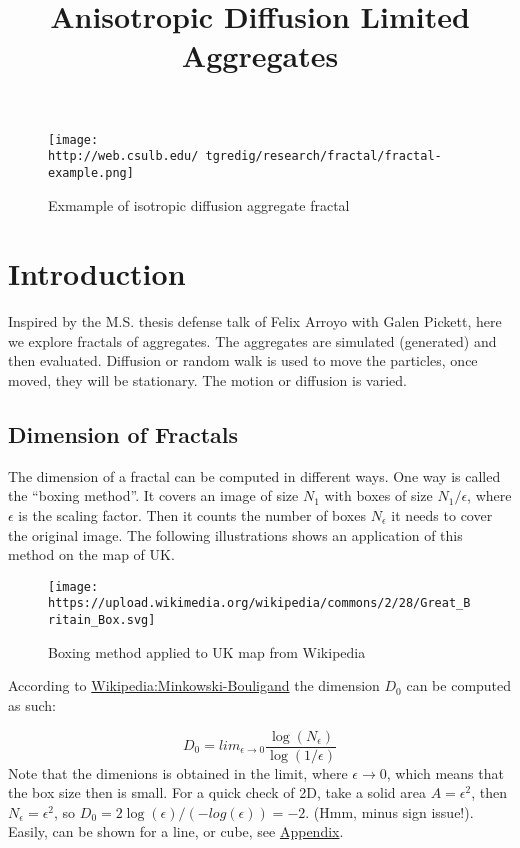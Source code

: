 \documentclass[]{article}
\title{Anisotropic Diffusion Limited Aggregates}
\author{}
\date{}
\begin{document}
\maketitle

{
\setcounter{tocdepth}{2}
\tableofcontents
}
\begin{figure}
\centering
\texttt{[image: http://web.csulb.edu/~tgredig/research/fractal/fractal-example.png]}
\caption{Exmample of isotropic diffusion aggregate fractal}
\end{figure}

\hypertarget{introduction}{%
\section{Introduction}\label{introduction}}

Inspired by the M.S. thesis defense talk of Felix Arroyo with Galen
Pickett, here we explore fractals of aggregates. The aggregates are
simulated (generated) and then evaluated. Diffusion or random walk is
used to move the particles, once moved, they will be stationary. The
motion or diffusion is varied.

\hypertarget{dimension-of-fractals}{%
\subsection{Dimension of Fractals}\label{dimension-of-fractals}}

The dimension of a fractal can be computed in different ways. One way is
called the ``boxing method''. It covers an image of size \(N_1\) with
boxes of size \(N_1/\epsilon\), where \(\epsilon\) is the scaling
factor. Then it counts the number of boxes \(N_\epsilon\) it needs to
cover the original image. The following illustrations shows an
application of this method on the map of UK.

\begin{figure}
\centering
\texttt{[image: https://upload.wikimedia.org/wikipedia/commons/2/28/Great\_Britain\_Box.svg]}
\caption{Boxing method applied to UK map from Wikipedia}
\end{figure}

According to
\href{https://en.wikipedia.org/wiki/Minkowski\%E2\%80\%93Bouligand_dimension}{Wikipedia:Minkowski-Bouligand}
the dimension \(D_0\) can be computed as such:

\[ D_0 = lim_{\epsilon \rightarrow 0} \frac{\log(N_\epsilon)}{\log(1/\epsilon)} \]
Note that the dimenions is obtained in the limit, where
\(\epsilon \rightarrow 0\), which means that the box size then is small.
For a quick check of 2D, take a solid area \(A = \epsilon^2\), then
\(N_\epsilon = \epsilon^2\), so
\(D_0 = 2\log(\epsilon)/(-log(\epsilon)) = -2\). (Hmm, minus sign
issue!). Easily, can be shown for a line, or cube, see
\protect\hyperlink{Appendix}{Appendix}.
\end{document}
